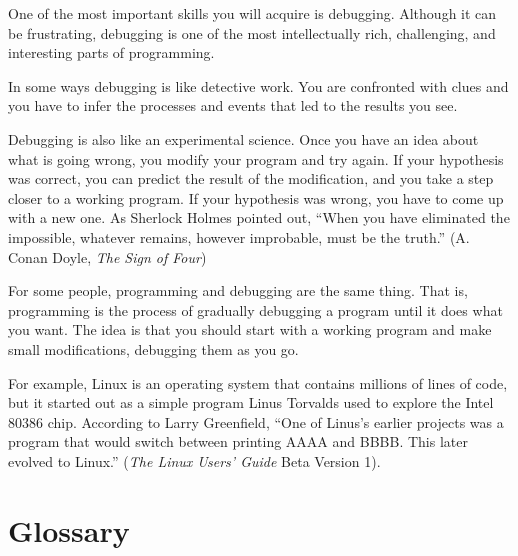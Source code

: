 \documentclass[10pt]{book}
\begin{document}
One of the most important skills you will acquire is debugging.
Although it can be frustrating, debugging is one of the most
intellectually rich, challenging, and interesting parts of
programming.

In some ways debugging is like detective work.  You are confronted
with clues and you have to infer the processes and events that led
to the results you see.

Debugging is also like an experimental science.  Once you have an idea
about what is going wrong, you modify your program and try again.  If
your hypothesis was correct, you can predict the result of the
modification, and you take a step closer to a working program.  If
your hypothesis was wrong, you have to come up with a new one.  As
Sherlock Holmes pointed out, ``When you have eliminated the
impossible, whatever remains, however improbable, must be the truth.''
(A. Conan Doyle, {\em The Sign of Four})

For some people, programming and debugging are the same thing.  That
is, programming is the process of gradually debugging a program until
it does what you want.  The idea is that you should start with a
working program and make small modifications,
debugging them as you go.

For example, Linux is an operating system that contains millions of
lines of code, but it started out as a simple program Linus Torvalds
used to explore the Intel 80386 chip.  According to Larry Greenfield,
``One of Linus's earlier projects was a program that would switch
between printing AAAA and BBBB.  This later evolved to Linux.''
({\em The Linux Users' Guide} Beta Version 1).


\section{Glossary}
\end{document}
